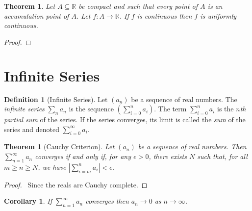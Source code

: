 \documentclass{article}
\let\qed\relax
\newtheorem{theorem}[axiom]{Theorem}
\newtheorem{corollary}{Corollary}[axiom]
\theoremstyle{definition}
\newtheorem{definition}[axiom]{Definition}
\begin{document}
\begin{theorem}
    Let $A \subseteq \mathbb{R}$ be compact and such that every point of $A$ is an accumulation point of $A$.
    Let $f : A \rightarrow \mathbb{R}$. If $f$ is continuous then $f$ is uniformly continuous.
\end{theorem}

\begin{proof}
    \pf
    \qed
\end{proof}

\section{Infinite Series}

\begin{definition}[Infinite Series]
    Let $(a_n)$ be a sequence of real numbers. The \emph{infinite series} $\sum_n a_n$ is the sequence $(\sum_{i=0}^n a_i)$. The term
    $\sum_{i=0}^n a_i$ is the \emph{$n$th partial sum} of the series. If the series converges, its limit is called the \emph{sum} of the
    series and denoted $\sum_{i=0}^\infty a_i$.
\end{definition}

\begin{theorem}[Cauchy Criterion]
    Let $(a_n)$ be a sequence of real numbers. Then $\sum_{n=1}^\infty a_n$ converges if and only if, for any $\epsilon > 0$,
    there exists $N$ such that, for all $m \geq n \geq N$, we have $|\sum_{i=m}^n a_i| < \epsilon$.
\end{theorem}

\begin{proof}
    \pf\ Since the reals are Cauchy complete. \qed
\end{proof}

\begin{corollary}
    If $\sum_{n=1}^\infty a_n$ converges then $a_n \rightarrow 0$ as $n \rightarrow \infty$.
\end{corollary}
\end{document}
